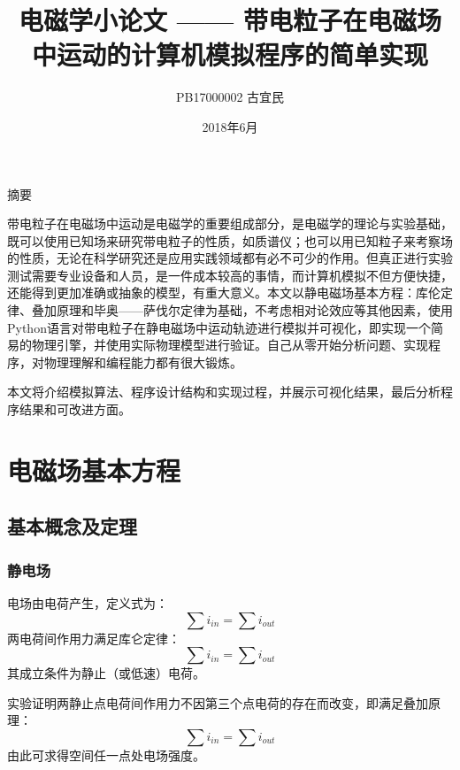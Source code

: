\documentclass[UTF-8,cs4size]{ctexart}
\title{电磁学小论文 —— 带电粒子在电磁场中运动的计算机模拟程序的简单实现}
\author{PB17000002  古宜民}
\date{2018年6月}
\begin{document}
 \normalsize


\maketitle
\begin{center}
	摘要
\end{center}

带电粒子在电磁场中运动是电磁学的重要组成部分，是电磁学的理论与实验基础，既可以使用已知场来研究带电粒子的性质，如质谱仪；也可以用已知粒子来考察场的性质，无论在科学研究还是应用实践领域都有必不可少的作用。但真正进行实验测试需要专业设备和人员，是一件成本较高的事情，而计算机模拟不但方便快捷，还能得到更加准确或抽象的模型，有重大意义。本文以静电磁场基本方程：库伦定律、叠加原理和毕奥——萨伐尔定律为基础，不考虑相对论效应等其他因素，使用Python语言对带电粒子在静电磁场中运动轨迹进行模拟并可视化，即实现一个简易的物理引擎，并使用实际物理模型进行验证。自己从零开始分析问题、实现程序，对物理理解和编程能力都有很大锻炼。


本文将介绍模拟算法、程序设计结构和实现过程，并展示可视化结果，最后分析程序结果和可改进方面。
\clearpage
\section{电磁场基本方程}
\subsection{基本概念及定理}
\subsubsection{静电场}
电场由电荷产生，定义式为：
\begin{equation}
	\sum i_{in} = \sum i_{out}
\end{equation}
两电荷间作用力满足库仑定律：
\begin{equation}
	\sum i_{in} = \sum i_{out}
\end{equation}
其成立条件为静止（或低速）电荷。


实验证明两静止点电荷间作用力不因第三个点电荷的存在而改变，即满足叠加原理：
\begin{equation}
	\sum i_{in} = \sum i_{out}
\end{equation}
由此可求得空间任一点处电场强度。
\end{document}
